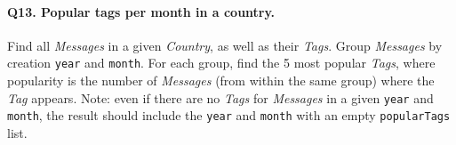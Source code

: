 \paragraph{\textbf{Q13}. Popular tags per month in a country.}
Find all \emph{Messages} in a given \emph{Country}, as well as their
\emph{Tags}.
Group \emph{Messages} by creation \texttt{year} and \texttt{month}. For
each group, find the 5 most popular \emph{Tags}, where popularity is the
number of \emph{Messages} (from within the same group) where the
\emph{Tag} appears.
Note: even if there are no \emph{Tags} for \emph{Messages} in a given
\texttt{year} and \texttt{month}, the result should include the
\texttt{year} and \texttt{month} with an empty \texttt{popularTags}
list.
